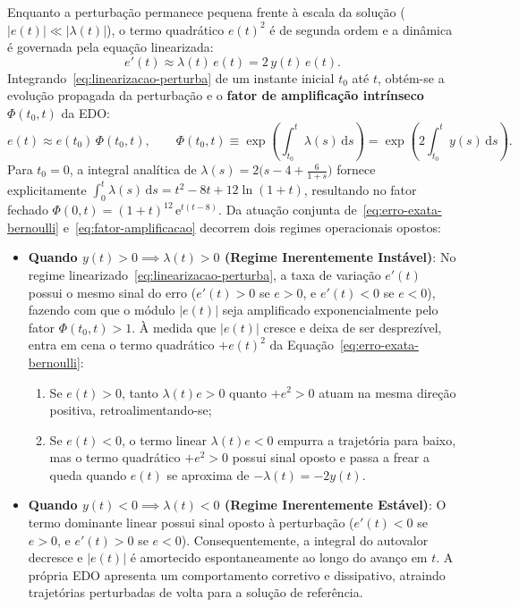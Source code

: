 \documentclass[12pt, a4paper]{article}
\begin{document}
Enquanto a perturbação permanece pequena frente à escala da solução ($|e(t)| \ll |\lambda(t)|$), o termo quadrático $e(t)^2$ é de segunda ordem e a dinâmica é governada pela equação linearizada:
\begin{equation}\label{eq:linearizacao-perturba}
  e'(t) \approx \lambda(t)\,e(t) = 2\,y(t)\,e(t).
\end{equation}
Integrando~\eqref{eq:linearizacao-perturba} de um instante inicial $t_0$ até $t$, obtém-se a evolução propagada da perturbação e o \textbf{fator de amplificação intrínseco} $\Phi(t_0, t)$ da EDO:
\begin{equation}\label{eq:fator-amplificacao}
  e(t) \approx e(t_0)\,\Phi(t_0, t), \qquad \Phi(t_0, t) \equiv \exp\!\left(\int_{t_0}^t \lambda(s)\,\mathrm{d}s\right) = \exp\!\left(2\int_{t_0}^t y(s)\,\mathrm{d}s\right).
\end{equation}
Para $t_0 = 0$, a integral analítica de $\lambda(s) = 2\bigl(s - 4 + \frac{6}{1+s}\bigr)$ fornece explicitamente $\int_0^t \lambda(s)\,\mathrm{d}s = t^2 - 8t + 12\ln(1+t)$, resultando no fator fechado $\Phi(0, t) = (1+t)^{12}\,\mathrm{e}^{t(t-8)}$. Da atuação conjunta de~\eqref{eq:erro-exata-bernoulli} e~\eqref{eq:fator-amplificacao} decorrem dois regimes operacionais opostos:
\begin{itemize}
    \item \textbf{Quando $y(t) > 0 \implies \lambda(t) > 0$ (Regime
          Inerentemente Instável)}:
    No regime linearizado~\eqref{eq:linearizacao-perturba}, a taxa de variação $e'(t)$ possui o mesmo sinal do erro ($e'(t) > 0$ se $e > 0$, e $e'(t) < 0$ se $e < 0$), fazendo com que o módulo $|e(t)|$ seja amplificado exponencialmente pelo fator $\Phi(t_0, t) > 1$. À medida que $|e(t)|$ cresce e deixa de ser desprezível, entra em cena o termo quadrático $+e(t)^2$ da Equação~\eqref{eq:erro-exata-bernoulli}:
    \begin{enumerate}
        \item Se $e(t) > 0$, tanto $\lambda(t)e > 0$ quanto $+e^2 > 0$ atuam na mesma direção positiva, retroalimentando-se;
        \item Se $e(t) < 0$, o termo linear $\lambda(t)e < 0$ empurra a trajetória para baixo, mas o termo quadrático $+e^2 > 0$ possui sinal oposto e passa a frear a queda quando $e(t)$ se aproxima de $-\lambda(t) = -2y(t)$.
    \end{enumerate}
    \item \textbf{Quando $y(t) < 0 \implies \lambda(t) < 0$ (Regime
          Inerentemente Estável)}:
    O termo dominante linear possui sinal oposto à perturbação ($e'(t) < 0$ se
    $e > 0$, e $e'(t) > 0$ se $e < 0$). Consequentemente, a integral do autovalor decresce e
    $|e(t)|$ é amortecido espontaneamente ao longo do avanço em $t$. A própria
    EDO apresenta um comportamento corretivo e dissipativo, atraindo trajetórias
    perturbadas de volta para a solução de referência.
\end{itemize}
\end{document}
